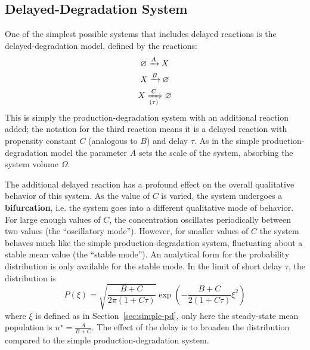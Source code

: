 \documentclass[english,letterpaper,12pt]{report}
\newcommand{\defkeywd}[1]{\textbf{#1}}
\begin{document}
\begin{doublespacing}


\section{Delayed-Degradation System} %
\label{sec:delayed-deg}

One of the simplest possible systems that includes delayed reactions is the delayed-degradation model, defined by the reactions:
\begin{align}
    \begin{gathered}
        \varnothing \xrightarrow{A} X \\
        X \xrightarrow {B} \varnothing \\
        X \xRightarrow[(\tau)]{C} \varnothing
    \end{gathered}
    \label{eq:delayed-deg-rxns}
\end{align}
This is simply the production-degradation system with an additional reaction added; the notation for the third reaction means it is a delayed reaction with propensity constant $C$ (analogous to $B$) and delay $\tau$. As in the simple production-degradation model the parameter $A$ sets the scale of the system, absorbing the system volume $\Omega$.

The additional delayed reaction has a profound effect on the overall qualitative behavior of this system. As the value of $C$ is varied, the system undergoes a \defkeywd{bifurcation}, i.e. the system goes into a different qualitative mode of behavior. For large enough values of $C$, the concentration oscillates periodically between two values (the ``oscillatory mode''). However, for smaller values of $C$ the system behaves much like the simple production-degradation system, fluctuating about a stable mean value (the ``stable mode''). An analytical form for the probability distribution is only available for the stable mode. In the limit of short delay $\tau$, the distribution is \cite{delayed-deg-notes}
\begin{equation}
    P(\xi) = \sqrt{\frac{B + C}{2\pi(1 + C\tau)}}\exp\left( -\frac{B + C}{2(1 + C\tau)} \xi^2 \right)
    \label{eq:dd-analytic-dist}
\end{equation}
where $\xi$ is defined as in Section~\ref{sec:simple-pd}, only here the steady-state mean population is $n^\star = \frac{A}{B + C}$. The effect of the delay is to broaden the distribution compared to the simple production-degradation system.


\end{doublespacing}
\end{document}
